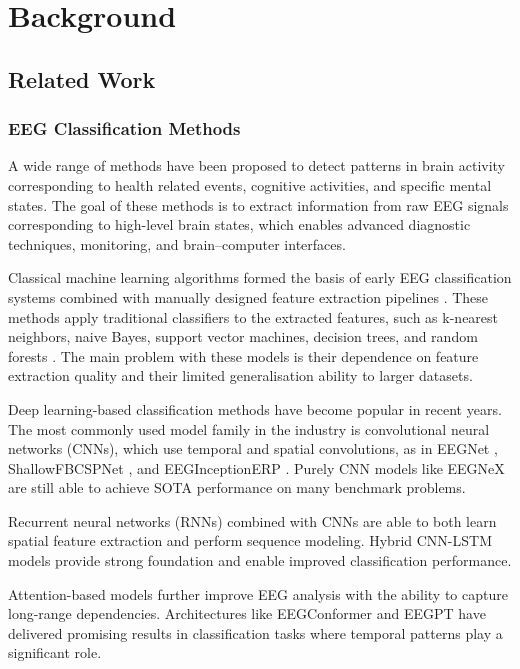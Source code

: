 
\chapter{Background}
\label{chap:background}

\section{Related Work}

\subsection{EEG Classification Methods}

A wide range of methods have been proposed to detect patterns in brain activity corresponding to health related events, cognitive activities, and specific mental states. The goal of these methods is to extract information from raw EEG signals corresponding to high-level brain states, which enables advanced diagnostic techniques, monitoring, and brain–computer interfaces.

Classical machine learning algorithms formed the basis of early EEG classification systems combined with manually designed feature extraction pipelines \cite{8972542}. These methods apply traditional classifiers to the extracted features, such as k-nearest neighbors, naive Bayes, support vector machines, decision trees, and random forests \cite{technologies10040079}. The main problem with these models is their dependence on feature extraction quality and their limited generalisation ability to larger datasets.

Deep learning-based classification methods have become popular in recent years. The most commonly used model family in the industry is convolutional neural networks (CNNs), which use temporal and spatial convolutions, as in EEGNet \cite{Lawhern_2018}, ShallowFBCSPNet \cite{EEGInceptionERP}, and EEGInceptionERP \cite{EEG-Inception}. Purely CNN models like EEGNeX \cite{CHEN2024105475} are still able to achieve SOTA performance on many benchmark problems. 

Recurrent neural networks (RNNs) combined with CNNs are able to both learn spatial feature extraction and perform sequence modeling. Hybrid CNN-LSTM \cite{inproceedings} models provide strong foundation and enable improved classification performance. 

Attention-based models further improve EEG analysis with the ability to capture long-range dependencies. Architectures like EEGConformer \cite{Conformer} and EEGPT \cite{wang2024eegpt} have delivered promising results in classification tasks where temporal patterns play a significant role.

